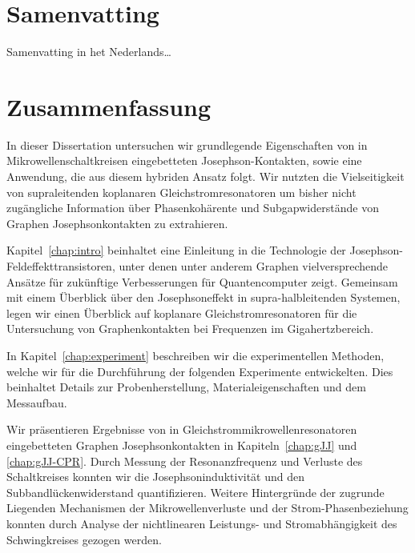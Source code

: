\chapter*{Samenvatting}

{%
Samenvatting in het Nederlands\ldots
}

\afterpage{\pagecolor{none}}

\chapter*{Zusammenfassung}

{%
In dieser Dissertation untersuchen wir grundlegende Eigenschaften von in Mikrowellenschaltkreisen eingebetteten Josephson-Kontakten, sowie eine Anwendung, die aus diesem hybriden Ansatz folgt.
%
Wir nutzten die Vielseitigkeit von supraleitenden koplanaren Gleichstromresonatoren um bisher nicht zugängliche Information über Phasenkohärente und Subgapwiderstände von Graphen Josephsonkontakten zu extrahieren.

\noindent \newline
Kapitel~\ref{chap:intro} beinhaltet eine Einleitung in die Technologie der Josephson-Feldeffekttransistoren, unter denen unter anderem Graphen vielversprechende Ansätze für zukünftige Verbesserungen für Quantencomputer zeigt.
%
Gemeinsam mit einem Überblick über den Josephsoneffekt in supra-halbleitenden Systemen, legen wir einen Überblick auf koplanare Gleichstromresonatoren für die Untersuchung von Graphenkontakten bei Frequenzen im Gigahertzbereich.

\noindent \newline
In Kapitel~\ref{chap:experiment} beschreiben wir die experimentellen Methoden, welche wir für die Durchführung der folgenden Experimente entwickelten.
%
Dies beinhaltet Details zur Probenherstellung, Materialeigenschaften und dem Messaufbau.

\noindent \newline
Wir präsentieren Ergebnisse von in Gleichstrommikrowellenresonatoren eingebetteten Graphen Josephsonkontakten in Kapiteln~\ref{chap:gJJ} und \ref{chap:gJJ-CPR}.
%
Durch Messung der Resonanzfrequenz und Verluste des Schaltkreises konnten wir die Josephsoninduktivität und den Subbandlückenwiderstand quantifizieren.
%
Weitere Hintergründe der zugrunde Liegenden Mechanismen der Mikrowellenverluste und der Strom-Phasenbeziehung konnten durch Analyse der nichtlinearen Leistungs- und Stromabhängigkeit des Schwingkreises gezogen werden.

}
